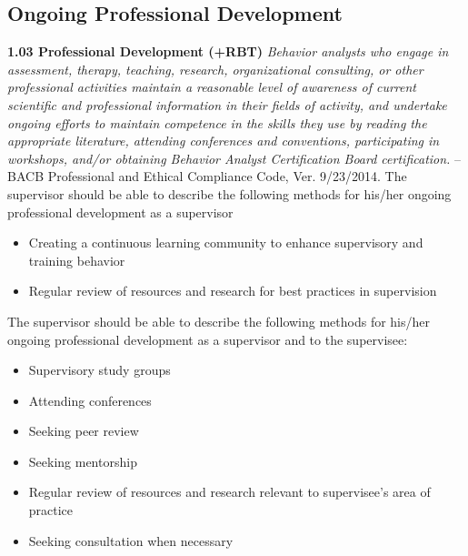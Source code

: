 \subsection{Ongoing Professional Development}
\textbf{1.03 Professional Development (+RBT)}
\textit{Behavior analysts who engage in assessment, therapy, teaching, research, organizational consulting, or other professional activities maintain a reasonable level of awareness of current scientific and professional information in their fields of activity, and undertake ongoing efforts to maintain competence in the skills they use by reading the appropriate literature, attending conferences and conventions, participating in workshops, and/or obtaining Behavior Analyst Certification Board certification.}
--BACB Professional and Ethical Compliance Code, Ver. 9/23/2014.
%
The supervisor should be able to describe the following methods for his/her ongoing professional development as a supervisor
\begin{itemize}
\item Creating a continuous learning community to enhance supervisory and training behavior
\item Regular review of resources and research for best practices in supervision
\end{itemize}
%
The supervisor should be able to describe the following methods for his/her ongoing professional development as a supervisor and to the supervisee:
\begin{itemize}
\item Supervisory study groups
\item Attending conferences
\item Seeking peer review
\item Seeking mentorship
\item Regular review of resources and research relevant to supervisee's area of practice
\item Seeking consultation when necessary
\end{itemize}